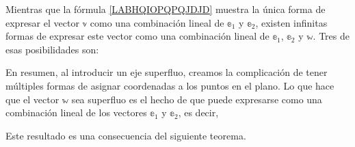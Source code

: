 \newpage
{}
Mientras que la fórmula \eqref{LABHQIOPQPQJDJD} muestra la única forma de expresar el vector $\mathbb{v}$ como una combinación lineal de $\mathbb{e}_1$ y $\mathbb{e}_2$, existen infinitas formas de expresar este vector como una combinación lineal de $\mathbb{e}_1$, $\mathbb{e}_2$ y $\mathbb{w}$. Tres de esas posibilidades son:
\begin{matrizn}
\end{matrizn}
En resumen, al introducir un eje superfluo, creamos la complicación de tener múltiples formas de asignar coordenadas a los puntos en el plano. Lo que hace que el vector $\mathbb{w}$ sea superfluo es el hecho de que puede expresarse como una combinación lineal de los vectores $\mathbb{e}_1$ y $\mathbb{e}_2$, es decir,
\begin{matrizn}
\end{matrizn}
Este resultado es una consecuencia del siguiente teorema.

